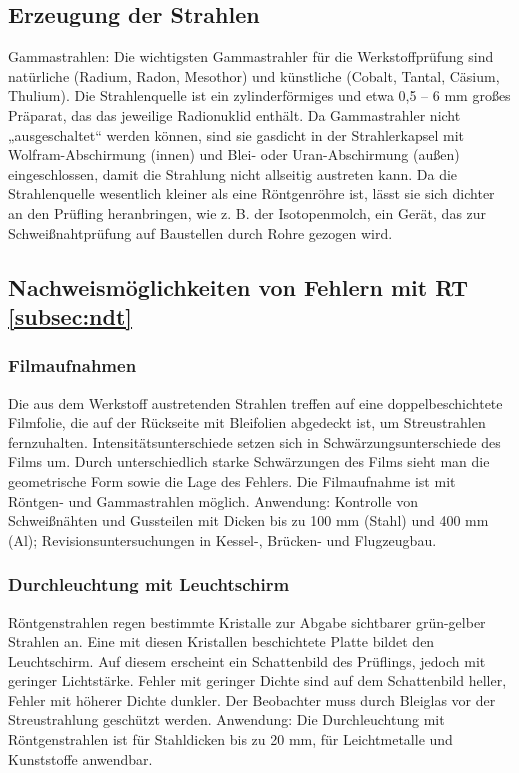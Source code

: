 \subsection{Erzeugung der Strahlen}
Gammastrahlen: Die wichtigsten Gammastrahler für die Werkstoffprüfung sind natürliche (Radium, Radon, Mesothor) und künstliche (Cobalt, Tantal, Cäsium, Thulium). Die Strahlenquelle ist ein zylinderförmiges und etwa 0,5 – 6 mm großes Präparat, das das jeweilige Radionuklid enthält. Da Gammastrahler nicht „ausgeschaltet“ werden können, sind sie gasdicht in der Strahlerkapsel mit Wolfram-Abschirmung (innen) und Blei- oder Uran-Abschirmung (außen) eingeschlossen, damit die Strahlung nicht allseitig austreten kann. Da die Strahlenquelle wesentlich kleiner als eine Röntgenröhre ist, lässt sie sich dichter an den Prüfling heranbringen, wie z. B. der Isotopenmolch, ein Gerät, das zur Schweißnahtprüfung auf Baustellen durch Rohre gezogen wird.
\\
\subsection{Nachweismöglichkeiten von Fehlern mit RT \ref{subsec:ndt}}

\subsubsection{Filmaufnahmen}
Die aus dem Werkstoff austretenden Strahlen treffen auf eine doppelbeschichtete Filmfolie, die auf der Rückseite mit Bleifolien abgedeckt ist, um Streustrahlen fernzuhalten. Intensitätsunterschiede setzen sich in Schwärzungsunterschiede des Films um. Durch unterschiedlich starke Schwärzungen des Films sieht man die geometrische Form sowie die Lage des Fehlers. Die Filmaufnahme ist mit Röntgen- und Gammastrahlen möglich.
Anwendung: Kontrolle von Schweißnähten und Gussteilen mit Dicken bis zu 100 mm (Stahl) und 400 mm (Al); Revisionsuntersuchungen in Kessel-, Brücken- und Flugzeugbau.\\
\subsubsection{Durchleuchtung mit Leuchtschirm}
Röntgenstrahlen regen bestimmte Kristalle zur Abgabe sichtbarer grün-gelber Strahlen an. Eine mit diesen Kristallen beschichtete Platte bildet den Leuchtschirm. Auf diesem erscheint ein Schattenbild des Prüflings, jedoch mit geringer Lichtstärke. Fehler mit geringer Dichte sind auf dem Schattenbild heller, Fehler mit höherer Dichte dunkler. Der Beobachter muss durch Bleiglas vor der Streustrahlung geschützt werden.
Anwendung: Die Durchleuchtung mit Röntgenstrahlen ist für Stahldicken bis zu 20 mm, für Leichtmetalle und Kunststoffe anwendbar.\\
